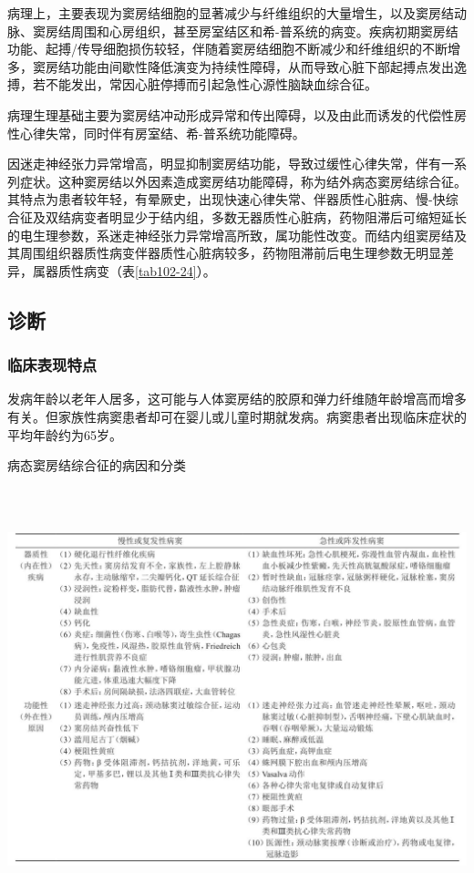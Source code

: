 病理上，主要表现为窦房结细胞的显著减少与纤维组织的大量增生，以及窦房结动脉、窦房结周围和心房组织，甚至房室结区和希-普系统的病变。疾病初期窦房结功能、起搏/传导细胞损伤较轻，伴随着窦房结细胞不断减少和纤维组织的不断增多，窦房结功能由间歇性降低演变为持续性障碍，从而导致心脏下部起搏点发出逸搏，若不能发出，常因心脏停搏而引起急性心源性脑缺血综合征。

病理生理基础主要为窦房结冲动形成异常和传出障碍，以及由此而诱发的代偿性房性心律失常，同时伴有房室结、希-普系统功能障碍。

因迷走神经张力异常增高，明显抑制窦房结功能，导致过缓性心律失常，伴有一系列症状。这种窦房结以外因素造成窦房结功能障碍，称为结外病态窦房结综合征。其特点为患者较年轻，有晕厥史，出现快速心律失常、伴器质性心脏病、慢-快综合征及双结病变者明显少于结内组，多数无器质性心脏病，药物阻滞后可缩短延长的电生理参数，系迷走神经张力异常增高所致，属功能性改变。而结内组窦房结及其周围组织器质性病变伴器质性心脏病较多，药物阻滞前后电生理参数无明显差异，属器质性病变（表\ref{tab102-24}）。

\subsection{诊断}

\subsubsection{临床表现特点}

发病年龄以老年人居多，这可能与人体窦房结的胶原和弹力纤维随年龄增高而增多有关。但家族性病窦患者却可在婴儿或儿童时期就发病。病窦患者出现临床症状的平均年龄约为65岁。

\begin{table}[htbp]
\centering
\caption{病态窦房结综合征的病因和分类}
\label{tab102-23}
\includegraphics[width=6.67708in,height=4.84375in]{./images/Image00464.jpg}
\end{table}


